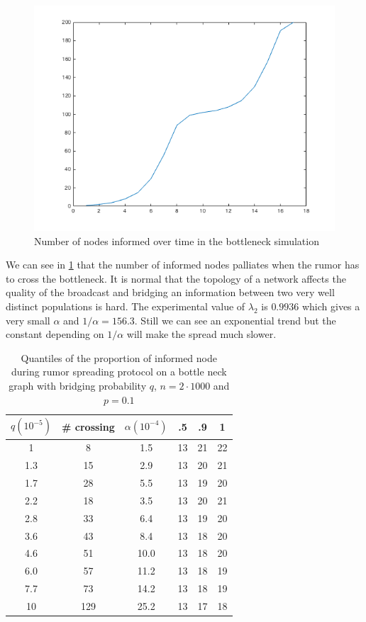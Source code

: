 \documentclass[10pt,journal,a4paper]{IEEEtran}
\begin{document}
\begin{figure}[h]
\centering
\includegraphics[width=1\linewidth]{figs/split-chart}
\caption{Number of nodes informed over time in the bottleneck simulation}
\label{fig:split-chart}
\end{figure}

We can see in \cref{fig:split-chart} that the number of informed nodes palliates when the rumor has to cross the bottleneck. It is normal that the topology of a network affects the quality of the broadcast and bridging an information between two very well distinct populations is hard. The experimental value of $\lambda_2$ is $0.9936$ which gives a very small $\alpha$ and $1/\alpha = 156.3$. Still we can see an exponential trend but the constant depending on $1/\alpha$ will make the spread much slower.

\begin{table}
\centering
\begin{tabular}{c|c|c||c|c|c}
  $q (10^{-5})$ & \# crossing & $\alpha (10^{-4})$ & .5 & .9 & 1\\
  \hline
  1 & 8 & 1.5 & 13 & 21 & 22 \\
1.3 & 15 & 2.9 & 13 & 20 & 21 \\
1.7 & 28 & 5.5 & 13 & 19 & 20 \\
2.2 & 18 & 3.5 & 13 & 20 & 21 \\
2.8 & 33 & 6.4 & 13 & 19 & 20 \\
3.6 & 43 & 8.4 & 13 & 18 & 20 \\
4.6 & 51 & 10.0 & 13 & 18 & 20 \\
6.0 & 57 & 11.2 & 13 & 18 & 19 \\
7.7 & 73 & 14.2 & 13 & 18 & 19 \\
10 & 129 & 25.2 & 13 & 17 & 18 \\
\end{tabular}
\caption{Quantiles of the proportion of informed node during rumor spreading protocol on a bottle neck graph with bridging probability $q$, $n = 2 \cdot 1000$ and $p = 0.1$}
\label{tab:quantiles}
\end{table}
\end{document}
